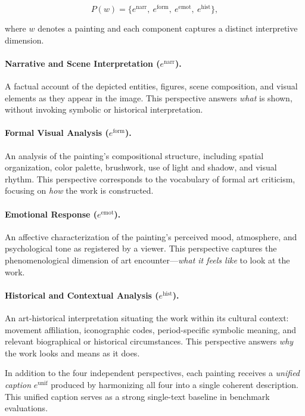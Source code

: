 \begin{equation}
P(w) = \{ e^{\text{narr}},\ e^{\text{form}},\ e^{\text{emot}},\ e^{\text{hist}} \},
\end{equation}

where $w$ denotes a painting and each component captures a distinct interpretive dimension.

\paragraph{Narrative and Scene Interpretation ($e^{\text{narr}}$).}
A factual account of the depicted entities, figures, scene composition, and visual elements as they appear in the image.
This perspective answers \textit{what} is shown, without invoking symbolic or historical interpretation.

\paragraph{Formal Visual Analysis ($e^{\text{form}}$).}
An analysis of the painting's compositional structure, including spatial organization, color palette, brushwork, use of light and shadow, and visual rhythm.
This perspective corresponds to the vocabulary of formal art criticism, focusing on \textit{how} the work is constructed.

\paragraph{Emotional Response ($e^{\text{emot}}$).}
An affective characterization of the painting's perceived mood, atmosphere, and psychological tone as registered by a viewer.
This perspective captures the phenomenological dimension of art encounter---\textit{what it feels like} to look at the work.

\paragraph{Historical and Contextual Analysis ($e^{\text{hist}}$).}
An art-historical interpretation situating the work within its cultural context: movement affiliation, iconographic codes, period-specific symbolic meaning, and relevant biographical or historical circumstances.
This perspective answers \textit{why} the work looks and means as it does.

In addition to the four independent perspectives, each painting receives a \textit{unified caption} $e^{\text{unif}}$ produced by harmonizing all four into a single coherent description.
This unified caption serves as a strong single-text baseline in benchmark evaluations.

